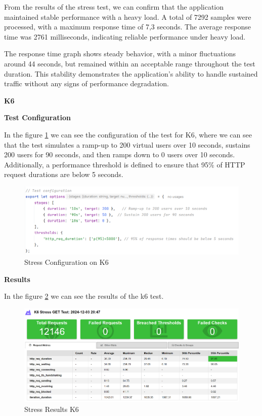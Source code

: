 \documentclass[a4paper,11pt,openright,BCOR=15mm]{scrbook}
\begin{document}
From the results of the stress test, we can confirm that the application maintained stable performance with a heavy load. A total of 7292 samples were processed, with a maximum response time of 7,3 seconds. The average response time was 2761 milliseconds, indicating reliable performance under heavy load.

The response time graph shows steady behavior, with a minor fluctuations around 44 seconds, but remained within an acceptable range throughout the test duration. This stability demonstrates the application's ability to handle sustained traffic without any signs of performance degradation.


\textbf{K6}




\textbf{Test Configuration}



In the figure \ref{fig:StressConfigurationK6} we can see the configuration of the test for K6, where we can see that the test simulates a ramp-up to 200 virtual users over 10 seconds, sustains 200 users for 90 seconds, and then ramps down to 0 users over 10 seconds. Additionally, a performance threshold is defined to ensure that 95\% of HTTP request durations are below 5 seconds.



\begin{figure}[H]
	\centering
	\includegraphics[width=\textwidth]{figs/Performance/k6/StressGetK6.png}
	\caption{Stress Configuration on K6}
	\label{fig:StressConfigurationK6}
\end{figure}




\textbf{Results}

In the figure \ref{fig:StressResultsK6} we can see the results of the k6 test.

\begin{figure}[H]
	\centering
	\includegraphics[width=\textwidth]{figs/Performance/k6/StressGetK6Result.png}
	\caption{Stress Results K6}
	\label{fig:StressResultsK6}
\end{figure}
\end{document}

